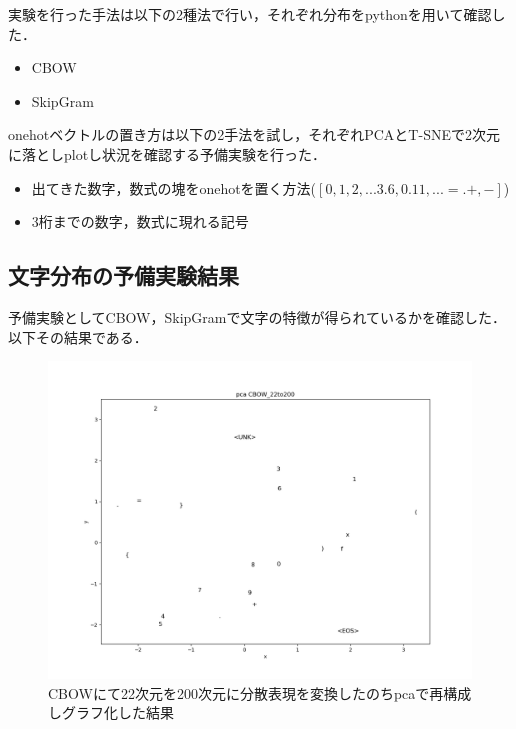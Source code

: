 \documentclass[a4j,11pt,report]{jsbook}
\begin{document}
実験を行った手法は以下の2種法で行い，それぞれ分布をpythonを用いて確認した．
\begin{itemize}
  \item CBOW
  \item SkipGram
\end{itemize}

onehotベクトルの置き方は以下の2手法を試し，それぞれPCAとT-SNEで2次元に落としplotし状況を確認する予備実験を行った．
\begin{itemize}
  \item 出てきた数字，数式の塊をonehotを置く方法($[0,1,2, ... 3.6,0.11,...=.+,-]$)
  \item 3桁までの数字，数式に現れる記号
\end{itemize}


\subsection{文字分布の予備実験結果}
予備実験としてCBOW，SkipGramで文字の特徴が得られているかを確認した．
以下その結果である．

\begin{center}
  \begin{figure}[H]
    \centering
    \includegraphics[width=\linewidth]{image/CBOW_pca_out22_200.png}
    \caption{CBOWにて22次元を200次元に分散表現を変換したのちpcaで再構成しグラフ化した結果}
    \label{fig:89x2cbow_pac}
  \end{figure}
\end{center}
\end{document}
